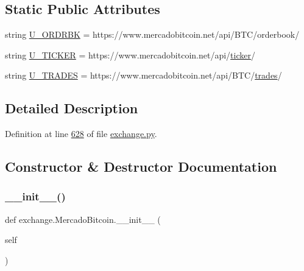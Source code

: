 \subsection*{Static Public Attributes}
\begin{DoxyCompactItemize}
\item 
string \hyperlink{classexchange_1_1_mercado_bitcoin_a7dd22c2c0261557a694678d8057d2547}{U\+\_\+\+O\+R\+D\+R\+BK} = \textquotesingle{}https\+://www.\+mercadobitcoin.\+net/api/B\+TC/orderbook/\textquotesingle{}
\item 
string \hyperlink{classexchange_1_1_mercado_bitcoin_a310b7df5ae9e8a46bad918428c67d4e8}{U\+\_\+\+T\+I\+C\+K\+ER} = \textquotesingle{}https\+://www.\+mercadobitcoin.\+net/api/\hyperlink{classexchange_1_1_exchange_a7cf9e52f993627955a2e242c388daaeb}{ticker}/\textquotesingle{}
\item 
string \hyperlink{classexchange_1_1_mercado_bitcoin_a20ad6407ef07ab8a55d3c022d1512a5d}{U\+\_\+\+T\+R\+A\+D\+ES} = \textquotesingle{}https\+://www.\+mercadobitcoin.\+net/api/B\+TC/\hyperlink{classexchange_1_1_exchange_a30e87a377320ce05bd956fb014683641}{trades}/\textquotesingle{}
\end{DoxyCompactItemize}


\subsection{Detailed Description}


Definition at line \hyperlink{exchange_8py_source_l00628}{628} of file \hyperlink{exchange_8py_source}{exchange.\+py}.



\subsection{Constructor \& Destructor Documentation}
\mbox{\label{classexchange_1_1_mercado_bitcoin_a7ae88346e48e6e1fa70ebe3281ba7357}} 
\subsubsection{\texorpdfstring{\+\_\+\+\_\+init\+\_\+\+\_\+()}{\_\_init\_\_()}}
{\footnotesize\ttfamily def exchange.\+Mercado\+Bitcoin.\+\_\+\+\_\+init\+\_\+\+\_\+ (\begin{DoxyParamCaption}\item[{}]{self }\end{DoxyParamCaption})}



